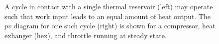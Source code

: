 \begin{figure}
\begin{center}
\end{center}
\caption{A cycle in contact with a single thermal reservoir (left) may operate such that work input leads to an equal amount of heat output. The $pv$ diagram for one such cycle (right) is shown for a compressor, heat exhanger (hex), and throttle running at steady state.}\label{fig:CycleWithThermalReservoir}
\end{figure}